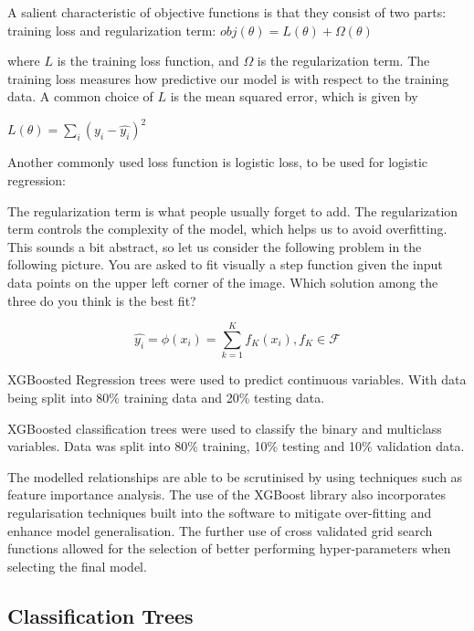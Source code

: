 \documentclass[review,12pt,authoryear]{elsarticle}
\begin{document}
\begin{linenumbers}
A salient characteristic of objective functions is that they consist of two parts: training loss and regularization term:
$obj(\theta)=L(\theta)+\Omega(\theta)$

where $L$ is the training loss function, and $\Omega$ is the regularization term. The training loss measures how predictive our model is with respect to the training data. A common choice of $L$ is the mean squared error, which is given by

$L(\theta)=\sum_i (y_i - \hat{y_i})^2$

Another commonly used loss function is logistic loss, to be used for logistic regression:

The regularization term is what people usually forget to add. The regularization term controls the complexity of the model, which helps us to avoid overfitting. This sounds a bit abstract, so let us consider the following problem in the following picture. You are asked to fit visually a step function given the input data points on the upper left corner of the image. Which solution among the three do you think is the best fit?


\[ \hat{y_i}=\phi(x_i)=\sum_{k=1}^{K}{f_{K}(x_{i})}, f_{K}\in \mathcal{F} \]

%


XGBoosted Regression trees were used to predict continuous variables. With data being split into 80\% training data and 20\% testing data.



XGBoosted classification trees were used to classify the binary and multiclass variables. Data was split into 80\% training, 10\% testing and 10\% validation data. 




The modelled relationships are able to be scrutinised by using techniques such as feature importance analysis. The use of the XGBoost library also incorporates regularisation techniques built into the software to mitigate over-fitting and enhance model generalisation. The further use of cross validated grid search functions allowed for the selection of better performing hyper-parameters when selecting the final model.




\subsection{Classification Trees}


\end{linenumbers}
\end{document}
